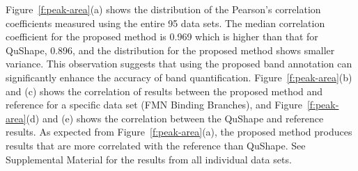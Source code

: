 Figure~\ref{f:peak-area}(a) shows the distribution of the Pearson's correlation coefficients measured using the entire 95 data sets. The median correlation coefficient for the proposed method is 0.969 which is higher than that for QuShape, 0.896, and the distribution for the proposed method shows smaller variance. This observation suggests that using the proposed band annotation can significantly enhance the accuracy of band quantification. Figure~\ref{f:peak-area}(b) and (c) shows the correlation of results between the proposed method and reference for a specific data set (FMN Binding Branches), and Figure~\ref{f:peak-area}(d) and (e) shows the correlation between the QuShape and reference results. As expected from Figure~\ref{f:peak-area}(a), the proposed method produces results that are more correlated with the reference than QuShape. See Supplemental Material for the results from all individual data sets.



